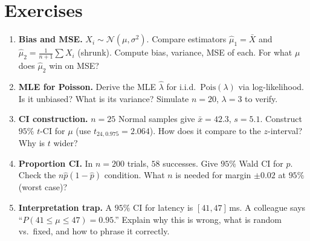 \section{Exercises}
\label{sec:ch07-exercises}
\begin{enumerate}[label=E7.\arabic*, leftmargin=*, itemsep=0.8em]
\item \textbf{Bias and MSE.} $X_i\sim\mathcal{N}(\mu,\sigma^2)$. Compare estimators $\hat\mu_1=\bar X$ and $\hat\mu_2=\frac1{n+1}\sum X_i$ (shrunk). Compute bias, variance, MSE of each. For what $\mu$ does $\hat\mu_2$ win on MSE?
\item \textbf{MLE for Poisson.} Derive the MLE $\hat\lambda$ for i.i.d.\ $\mathrm{Pois}(\lambda)$ via log-likelihood. Is it unbiased? What is its variance? Simulate $n=20$, $\lambda=3$ to verify.
\item \textbf{CI construction.} $n=25$ Normal samples give $\bar x=42.3$, $s=5.1$. Construct $95\%$ $t$-CI for $\mu$ (use $t_{24,0.975}=2.064$). How does it compare to the $z$-interval? Why is $t$ wider?
\item \textbf{Proportion CI.} In $n=200$ trials, $58$ successes. Give $95\%$ Wald CI for $p$. Check the $n\hat p(1-\hat p)$ condition. What $n$ is needed for margin $\pm0.02$ at $95\%$ (worst case)?
\item \textbf{Interpretation trap.} A $95\%$ CI for latency is $[41,47]\,$ms. A colleague says ``$P(41\le\mu\le47)=0.95$.'' Explain why this is wrong, what is random vs.\ fixed, and how to phrase it correctly.
\end{enumerate}
